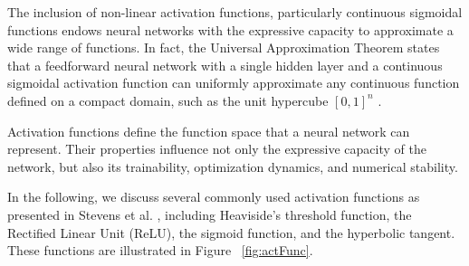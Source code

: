 The inclusion of non-linear activation functions, particularly continuous sigmoidal functions endows neural networks with the expressive capacity to approximate a wide range of functions.
In fact, the Universal Approximation Theorem states that a feedforward neural network with a single hidden layer and a continuous sigmoidal activation function can uniformly approximate any continuous function defined on a compact domain, such as the unit hypercube $[0,1]^n$ \cite{cybenkot_approximation_nodate}.

Activation functions define the function space that a neural network can represent.
Their properties influence not only the expressive capacity of the network, but also its trainability, optimization dynamics, and numerical stability.

In the following, we discuss several commonly used activation functions as presented in Stevens et al. \cite{antiga_deep_2020}, including Heaviside's threshold function, the Rectified Linear Unit (ReLU), the sigmoid function, and the hyperbolic tangent. These functions are illustrated in Figure~ \ref{fig:actFunc}.


